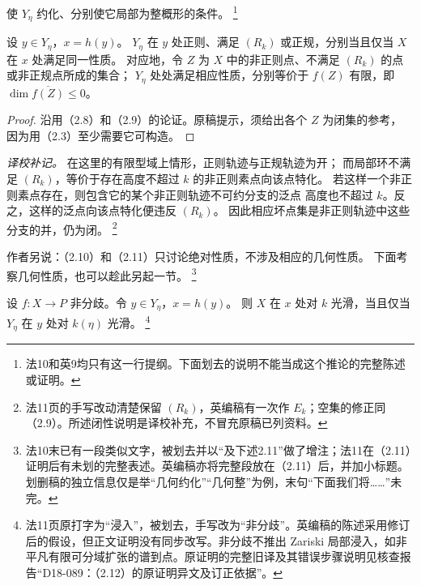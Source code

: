 使 $Y_\eta$ 约化、分别使它局部为整概形的条件。%
\footnote{法10和英9均只有这一行提纲。下面划去的说明不能当成这个推论的完整陈述或证明。}

设 $y\in Y_\eta$，$x=h(y)$。
$Y_\eta$ 在 $y$ 处正则、满足 $(R_k)$ 或正规，分别当且仅当 $X$ 在 $x$ 处满足同一性质。
对应地，令 $Z$ 为 $X$ 中的非正则点、不满足 $(R_k)$ 的点或非正规点所成的集合；
$Y_\eta$ 处处满足相应性质，分别等价于 $f(Z)$ 有限，即 $\dim\overline{f(Z)}\le0$。
\begin{proof}
沿用（2.8）和（2.9）的论证。原稿提示，须给出各个 $Z$ 为闭集的参考，
因为用（2.3）至少需要它可构造。
\end{proof}
\noindent\emph{译校补记。}
在这里的有限型域上情形，正则轨迹与正规轨迹为开；
而局部环不满足 $(R_k)$，等价于存在高度不超过 $k$ 的非正则素点向该点特化。
若这样一个非正则素点存在，则包含它的某个非正则轨迹不可约分支的泛点
高度也不超过 $k$。反之，这样的泛点向该点特化便违反 $(R_k)$。
因此相应坏点集是非正则轨迹中这些分支的并，仍为闭。%
\footnote{法11页的手写改动清楚保留 $(R_k)$，英编稿有一次作 $E_k$；空集的修正同（2.9）。所述闭性说明是译校补充，不冒充原稿已列资料。}

作者另说：（2.10）和（2.11）只讨论绝对性质，不涉及相应的几何性质。
下面考察几何性质，也可以趁此另起一节。%
\footnote{法10末已有一段类似文字，被划去并以“及下述2.11”做了增注；法11在（2.11）证明后有未划的完整表述。英编稿亦将完整段放在（2.11）后，并加小标题。划删稿的独立信息仅是举“几何约化”“几何整”为例，末句“下面我们将……”未完。}

设 $f:X\to P$ 非分歧。令 $y\in Y_\eta$，$x=h(y)$。
则 $X$ 在 $x$ 处对 $k$ 光滑，当且仅当 $Y_\eta$ 在 $y$ 处对 $k(\eta)$ 光滑。%
\footnote{法11页原打字为“浸入”，被划去，手写改为“非分歧”。英编稿的陈述采用修订后的假设，但正文证明没有同步改写。非分歧不推出 Zariski 局部浸入，如非平凡有限可分域扩张的谱到点。原证明的完整旧译及其错误步骤说明见核查报告“D18-089：（2.12）的原证明异文及订正依据”。}

